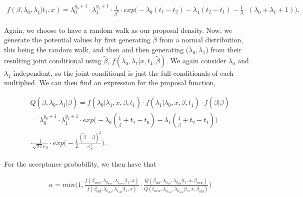 \begin{align}
    f(\beta, \lambda_0, \lambda_1| t_1, x) = 
    \lambda_0^{y_0 + 1} \cdot \lambda_1^{y_1 + 1} \cdot \frac{1}{\beta^5} \cdot exp\Bigg(  -\lambda_0(t_1 - t_2) 
    - \lambda_1 (t_2 - t_1 ) 
    - \frac{1}{\beta} \cdot (\lambda_0 + \lambda_1  + 1) \Bigg). 
\end{align}


Again, we choose to have a random walk as our proposal density. Now, we generate the potential values by first generating $\widetilde{\beta}$ from a normal distribution, this being the random walk, and then and then generating ($\widetilde{\lambda}_0, \widetilde{\lambda}_1$) from their resulting joint conditional using $\widetilde{\beta}$, $f(\lambda_0, \lambda_1|x,t_1,\widetilde{\beta})$. 
We again consider $\lambda_0$ and $\lambda_1$ independent, so the joint conditional is just the full conditionals of each multiplied. We can then find an expression for the proposal function,

\begin{align}
    Q(\widetilde{\beta}, \lambda_0, \lambda_1| \beta) = f(\lambda_0| \lambda_1, x, \widetilde{\beta}, t_1)\cdot f(\lambda_1| \lambda_0, x, \widetilde{\beta}, t_1)\cdot f(\widetilde{\beta}| \beta) \nonumber \\
    = \lambda_0^{y_0 + 1} \cdot \lambda_1^{y_1 + 1} \cdot exp \Big( -\lambda_0(\frac{1}{\widetilde{\beta}} + t_1 - t_0) - \lambda_1(\frac{1}{\widetilde{\beta}} + t_2 - t_1)  \Big)  \nonumber \\ \cdot \frac{1}{\sqrt{2 \pi}\sigma_{\beta} } \cdot exp \Big(  -\frac{1}{2} \frac{(\widetilde{\beta}-\beta)^2}{\sigma_{\beta}^2} \Big).
\end{align}




For the acceptance probability, we then have that 

\begin{align}
    \alpha = min \Bigg(1,  \frac{
    f(\beta_{new}, \lambda_{0_{new}}, \lambda_{1_{new}}|t_1, x)}{f(\beta_{old}, \lambda_{0_{old}}, \lambda_{1_{old}}|t_1, x)}
    \cdot 
    \frac{Q(\beta_{old}, \lambda_{0_{old}}, \lambda_{0_{old}} | t_1, x, \beta_{new})}{Q(t_{new}, \lambda_{0_{new}}, \lambda_{0_{new}} | t_1, x, \beta_{old})} \Bigg) %
\end{align}

